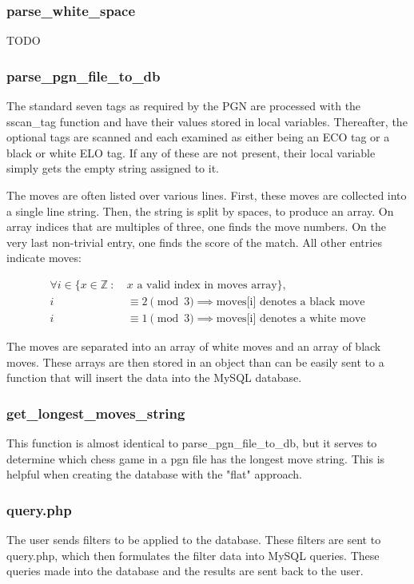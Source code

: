 \documentclass{article}
\begin{document}
\subsubsection*{parse\_white\_space}
TODO

\subsubsection*{parse\_pgn\_file\_to\_db}

The standard seven tags as required by the PGN are processed with the sscan\_tag function and have their values stored in local variables. Thereafter, the optional tags are scanned and each examined as either being an ECO tag or a black or white ELO tag.  If any of these are not present, their local variable simply gets the empty string assigned to it.

The moves are often listed over various lines.  First, these moves are collected into a single line string.  Then, the string is split by spaces, to produce an array.  On array indices that are multiples of three, one finds the move numbers.  On the very last non-trivial entry, one finds the score of the match.  All other entries indicate moves:

\begin{align*}
\forall i \in \{ x\in \mathbb{Z}\ :\ & x\text{ a valid index in moves array}\},\\
i & \equiv 2\pmod 3 \implies \text{moves[i] denotes a black move}\\
i & \equiv 1\pmod 3 \implies \text{moves[i] denotes a white move}
\end{align*}

The moves are separated into an array of white moves and an array of black moves. These arrays are then stored in an object than can be easily sent to a function that will insert the data into the MySQL database.

\subsubsection*{get\_longest\_moves\_string}
This function is almost identical to parse\_pgn\_file\_to\_db, but it serves to determine which chess game in a pgn file has the longest move string.  This is helpful when creating the database with the "flat" approach.


\subsubsection{query.php}
The user sends filters to be applied to the database.  These filters are sent to query.php, which then formulates the filter data into MySQL queries.  These queries made into the database and the results are sent back to the user.
\end{document}
